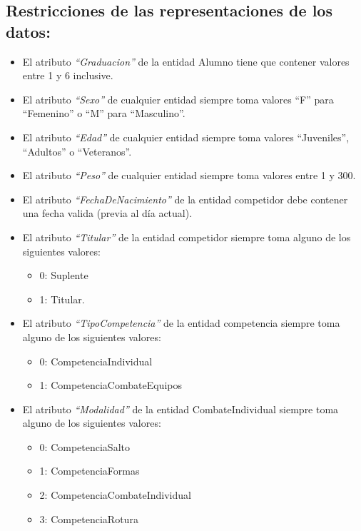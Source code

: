 \subsection{Restricciones de las representaciones de los datos:}
\begin{itemize}
    \item El atributo \textit{``Graduacion''} de la entidad Alumno tiene que contener valores entre 1 y 6 inclusive.
    \item El atributo \textit{``Sexo''} de cualquier entidad siempre toma valores ``F'' para ``Femenino'' o ``M'' para ``Masculino''.
    \item El atributo \textit{``Edad''} de cualquier entidad siempre toma valores ``Juveniles'', ``Adultos'' o ``Veteranos''.
    \item El atributo \textit{``Peso''} de cualquier entidad siempre toma valores entre 1 y 300.
    \item El atributo \textit{``FechaDeNacimiento''} de la entidad competidor debe contener una fecha valida (previa al día actual).
    \item El atributo \textit{``Titular''} de la entidad competidor siempre toma alguno de los siguientes valores:
    \begin{itemize}
        \item 0: Suplente 
        \item 1: Titular.
    \end{itemize} 
    \item El atributo \textit{``TipoCompetencia''} de la entidad competencia siempre toma alguno de los siguientes valores: 
    \begin{itemize}
        \item 0: CompetenciaIndividual
        \item 1: CompetenciaCombateEquipos
    \end{itemize} 
    \item El atributo \textit{``Modalidad''} de la entidad CombateIndividual siempre toma alguno de los siguientes valores:
    \begin{itemize}
        \item 0: CompetenciaSalto
        \item 1: CompetenciaFormas
        \item 2: CompetenciaCombateIndividual
        \item 3: CompetenciaRotura
    \end{itemize}
\end{itemize}

